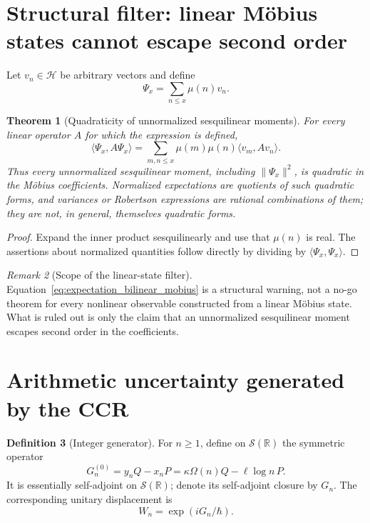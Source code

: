 \documentclass[11pt]{amsart}
\numberwithin{equation}{section}
\theoremstyle{plain}
\newtheorem{theorem}{Theorem}[section]
\theoremstyle{definition}
\newtheorem{definition}[theorem]{Definition}
\theoremstyle{remark}
\newtheorem{remark}[theorem]{Remark}
\newcommand{\R}{\mathbb{R}}
\newcommand{\Hil}{\mathcal{H}}
\newcommand{\Sch}{\mathcal{S}}
\begin{document}
\section{Structural filter: linear M\"obius states cannot escape second order}
\label{sec:linear_state_filter}

Let \(v_n\in\Hil\) be arbitrary vectors and define
\begin{equation}
\Psi_x=\sum_{n\le x}\mu(n)v_n.
\label{eq:linear_mobius_state}
\end{equation}

\begin{theorem}[Quadraticity of unnormalized sesquilinear moments]
\label{thm:linear_state_quadratic_obstruction}
For every linear operator \(A\) for which the expression is defined,
\begin{equation}
\langle\Psi_x,A\Psi_x\rangle
=\sum_{m,n\le x}\mu(m)\mu(n)\langle v_m,Av_n\rangle.
\label{eq:expectation_bilinear_mobius}
\end{equation}
Thus every unnormalized sesquilinear moment, including
\(\|\Psi_x\|^2\), is quadratic in the M\"obius coefficients.
Normalized expectations are quotients of such quadratic forms, and variances
or Robertson expressions are rational combinations of them; they are not,
in general, themselves quadratic forms.
\end{theorem}

\begin{proof}
Expand the inner product sesquilinearly and use that \(\mu(n)\) is real.
The assertions about normalized quantities follow directly by dividing by
\(\langle\Psi_x,\Psi_x\rangle\).
\end{proof}

\begin{remark}[Scope of the linear-state filter]
\label{rem:linear_state_filter_scope}
Equation~\eqref{eq:expectation_bilinear_mobius} is a structural warning, not a
no-go theorem for every nonlinear observable constructed from a linear
M\"obius state.  What is ruled out is only the claim that an unnormalized
sesquilinear moment escapes second order in the coefficients.
\end{remark}

\section{Arithmetic uncertainty generated by the CCR}
\label{sec:arithmetic_uncertainty}

\begin{definition}[Integer generator]
\label{def:integer_generator}
For \(n\ge1\), define on \(\Sch(\R)\) the symmetric operator
\begin{equation}
G_n^{(0)}=y_nQ-x_nP
=\kappa\Omega(n)Q-\ell\log n\,P.
\label{eq:Gn_definition}
\end{equation}
It is essentially self-adjoint on \(\Sch(\R)\); denote its self-adjoint
closure by \(G_n\).  The corresponding unitary displacement is
\begin{equation}
W_n=\exp(iG_n/\hbar).
\label{eq:Wn_from_Gn}
\end{equation}
\end{definition}
\end{document}
